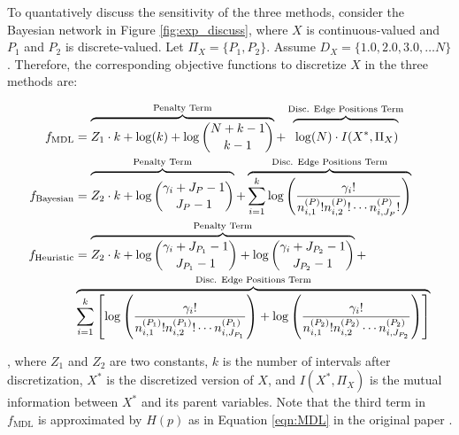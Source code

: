 To quantatively discuss the sensitivity of the three methods, consider the Bayesian network in Figure \ref{fig:exp_discuss}, where $X$ is continuous-valued and $P_1$ and $P_2$ is discrete-valued. Let $\Pi_X = \{  P_1, P_2 \}$. Assume $D_X = \{1.0,2.0,3.0, \ldots N \}$. Therefore, the corresponding objective functions to discretize $X$ in the three methods are:

{\begin{small}
\begin{equation}
\begin{aligned}
f_{\text{MDL}} & = \overbrace{Z_1 \cdot k + \log(k) + \log {{N +k - 1}\choose{k -1}} }^{\text{Penalty Term}}+   \overbrace{\rule{0pt}{1.35em} \log(N) \cdot I(X^*, \Pi_X)}^{\text{Disc. Edge Positions Term}} \\
f_{\text{Bayesian}} &= \overbrace{\rule{0pt}{1.85em}  Z_2 \cdot k + \log {{\gamma_i + J_P - 1}\choose{J_P -1}}}^{\text{Penalty Term}} + \overbrace{\sum^k_{i=1} \log \left(   {{\gamma_i !}\over{n^{(P)}_{i,1}! n^{(P)}_{i,2}! \cdots n^{(P)}_{i,J_P}!    }} \right) }^{\text{Disc. Edge Positions Term}}\\
f_{\text{Heuristic}} &= \overbrace{Z_2 \cdot k + \log {{\gamma_i + J_{P_1} - 1}\choose{J_{P_1} -1}} + \log {{\gamma_i + J_{P_2} - 1}\choose{J_{P_2} -1}} }^{\text{Penalty Term}}+\\
& \overbrace{\sum^k_{i=1}  \left[ \log \left(   {{\gamma_i !}\over{n^{(P_1)}_{i,1}! n^{(P_1)}_{i,2}! \cdots n^{(P_1)}_{i,J_{P_1}}    }} \right)  + \log \left(   {{\gamma_i !}\over{n^{(P_2)}_{i,1}! n^{(P_2)}_{i,2} \cdots n^{(P_2)}_{i,J_{P_2}} }} \right) \right]}^{\text{Disc. Edge Positions Term}}
\end{aligned}
\end{equation}
\end{small}}

, where $Z_1$ and $Z_2$ are two constants, $k$ is the number of intervals after discretization, $X^*$ is the discretized version of $X$, and $I(X^*, \Pi_X)$ is the mutual information between $X^*$ and its parent variables. Note that the third term in $f_{\text{MDL}}$ is approximated by $H(p)$ as in Equation \ref{eqn:MDL} in the original paper \citep{Friedman_1996}.

